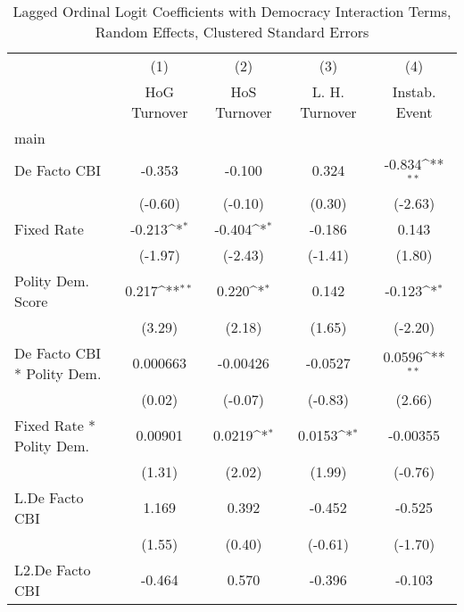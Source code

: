 {
\def\sym#1{\ifmmode^{#1}\else\(^{#1}\)\fi}
\begin{longtable}{l*{4}{c}}
\caption{Lagged Ordinal Logit Coefficients with Democracy Interaction Terms, Random Effects, Clustered Standard Errors \label{demintlagordLogLogDF}}\\
\hline\hline\endfirsthead\hline\endhead\hline\endfoot\endlastfoot
                &\multicolumn{1}{c}{(1)}&\multicolumn{1}{c}{(2)}&\multicolumn{1}{c}{(3)}&\multicolumn{1}{c}{(4)}\\
                &\multicolumn{1}{c}{HoG Turnover}&\multicolumn{1}{c}{HoS Turnover}&\multicolumn{1}{c}{L. H. Turnover}&\multicolumn{1}{c}{Instab. Event}\\
\hline
main            &                  &                  &                  &                  \\
De Facto CBI    &   -0.353         &   -0.100         &    0.324         &   -0.834\sym{**} \\
                &  (-0.60)         &  (-0.10)         &   (0.30)         &  (-2.63)         \\
[1em]
Fixed Rate      &   -0.213\sym{*}  &   -0.404\sym{*}  &   -0.186         &    0.143         \\
                &  (-1.97)         &  (-2.43)         &  (-1.41)         &   (1.80)         \\
[1em]
Polity Dem. Score&    0.217\sym{**} &    0.220\sym{*}  &    0.142         &   -0.123\sym{*}  \\
                &   (3.29)         &   (2.18)         &   (1.65)         &  (-2.20)         \\
[1em]
De Facto CBI * Polity Dem.& 0.000663         & -0.00426         &  -0.0527         &   0.0596\sym{**} \\
                &   (0.02)         &  (-0.07)         &  (-0.83)         &   (2.66)         \\
[1em]
Fixed Rate * Polity Dem.&  0.00901         &   0.0219\sym{*}  &   0.0153\sym{*}  & -0.00355         \\
                &   (1.31)         &   (2.02)         &   (1.99)         &  (-0.76)         \\
[1em]
L.De Facto CBI  &    1.169         &    0.392         &   -0.452         &   -0.525         \\
                &   (1.55)         &   (0.40)         &  (-0.61)         &  (-1.70)         \\
[1em]
L2.De Facto CBI &   -0.464         &    0.570         &   -0.396         &   -0.103         \\

\end{longtable}}
